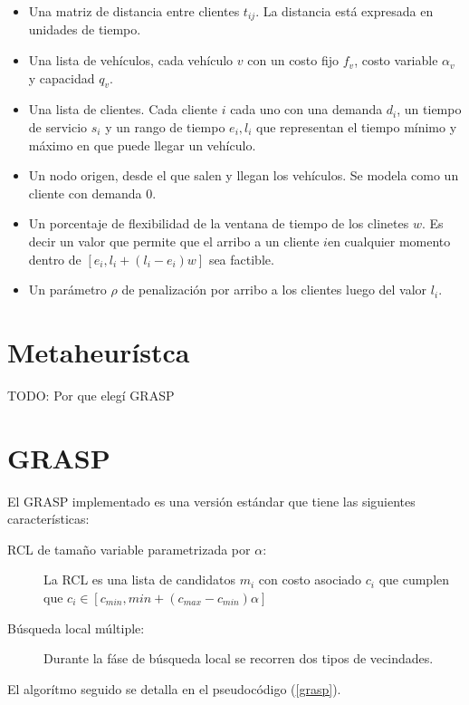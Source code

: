 \documentclass{article}
\begin{document}
  \begin{itemize}
    \item Una matriz de distancia entre clientes $t_{ij}$. La distancia está expresada en unidades de tiempo.
    \item Una lista de vehículos, cada vehículo $v$ con un costo fijo $f_v$, costo variable $\alpha_v$ y capacidad $q_v$.
    \item Una lista de clientes. Cada cliente $i$ cada uno con una demanda $d_i$, un tiempo de servicio $s_i$ y un rango de tiempo $e_i, l_i$ que representan el tiempo mínimo y máximo en que puede llegar un vehículo.
    \item Un nodo origen, desde el que salen y llegan los vehículos. Se modela como un cliente con demanda 0.
    \item Un porcentaje de flexibilidad de la ventana de tiempo de los clinetes $w$. Es decir un valor que permite que el arribo a un cliente $i$en cualquier momento dentro de $[e_i, l_i + (l_i - e_i)w]$ sea factible.
    \item Un parámetro $\rho$ de penalización por arribo a los clientes luego del valor $l_i$.
  \end{itemize}

  \section*{Metaheurístca}

  TODO: Por que elegí GRASP

  \section*{GRASP}
  
  El GRASP implementado es una versión estándar que tiene las siguientes características:

  \begin{description}
    \item[RCL de tamaño variable parametrizada por $\alpha$:] La RCL es una lista de candidatos $m_i$ con costo asociado $c_i$ que cumplen que $c_i \in [c_{min}, min + (c_{max} - c_{min}) \alpha]$
    \item[Búsqueda local múltiple:] Durante la fáse de búsqueda local se recorren dos tipos de vecindades.
  \end{description}

  El algorítmo seguido se detalla en el pseudocódigo (\ref{grasp}).
\end{document}
